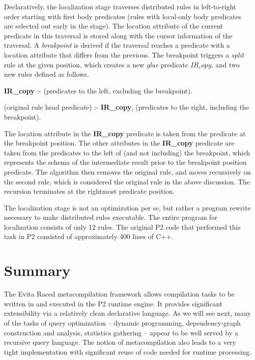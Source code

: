 Declaratively, the localization stage traverses distributed rules in
left-to-right order starting with first body predicates (rules with local-only
body predicates are selected out early in the stage).  The location attribute
of the current predicate in this traversal is stored along with the cursor
information of the traversal.  A {\em breakpoint} is derived if the traversal
reaches a predicate with a location attribute that differs from the previous.
The breakpoint triggers a {\em split} rule at the given position, which creates
a new {\em glue} predicate $IR_copy$, and two new rules defined as follows.
\begin{CompactEnumerate} 
\item {\bf IR\_copy} :- (predicates to the left, excluding the breakpoint).  
\item (original rule head predicate) :- {\bf IR\_copy}, (predicates to the right, including
  the breakpoint).  
\end{CompactEnumerate} 
The location attribute in the {\bf IR\_copy} predicate is taken from the
predicate at the breakpoint position.  The other attributes in the {\bf
IR\_copy} predicate are taken from the predicates to the left of (and not
including) the breakpoint, which represents the schema of the intermediate
result prior to the breakpoint position predicate.  The algorithm then removes
the original rule, and moves recursively on the second rule, which is
considered the original rule in the above discussion.  The recursion terminates
at the rightmost predicate position.

The localization stage is not an optimization per se, but rather a program
rewrite necessary to make distributed rules executable.  The entire \OVERLOG
program for localization consists of only 12 rules.  The original P2 code that
performed this task in P2 consisted of approximately 400 lines of C++.

\section{Summary} 
\label{ch:evita:sec:summary} 

The Evita Raced metacompilation framework allows \OVERLOG compilation tasks to
be written in \OVERLOG and executed in the P2 runtime engine.  It provides
significant extensibility via a relatively clean declarative language.  As we
will see next, many of the tasks of query optimization -- dynamic programming,
dependency-graph construction and analysis, statistics gathering -- appear to
be well served by a recursive query language.  The notion of metacompilation
also leads to a very tight implementation with significant reuse of code needed
for runtime processing.

